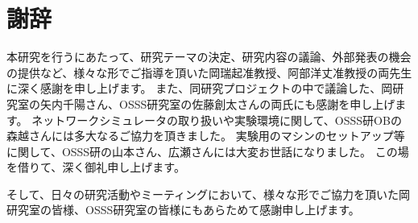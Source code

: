 \documentclass[a4paper,11pt]{jreport}
\begin{document}
\newpage

\chapter*{謝辞}

本研究を行うにあたって、研究テーマの決定、研究内容の議論、外部発表の機会の提供など、様々な形でご指導を頂いた岡瑞起准教授、阿部洋丈准教授の両先生に深く感謝を申し上げます。
また、同研究プロジェクトの中で議論した、岡研究室の矢内千陽さん、OSSS研究室の佐藤創太さんの両氏にも感謝を申し上げます。
ネットワークシミュレータの取り扱いや実験環境に関して、OSSS研OBの森越さんには多大なるご協力を頂きました。
実験用のマシンのセットアップ等に関して、OSSS研の山本さん、広瀬さんには大変お世話になりました。
この場を借りて、深く御礼申し上げます。

そして、日々の研究活動やミーティングにおいて、様々な形でご協力を頂いた岡研究室の皆様、OSSS研究室の皆様にもあらためて感謝申し上げます。

\newpage

\renewcommand{\bibname}{参考文献}



\end{document}

